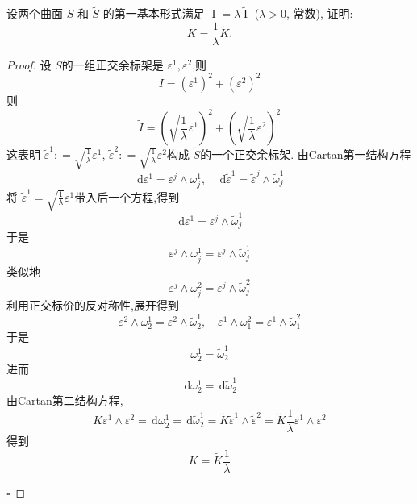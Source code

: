 \documentclass[../../main.tex]{subfiles}
\begin{document}
\begin{problem}
 设两个曲面 $S$ 和 $\tilde{S}$ 的第一基本形式满足 $\operatorname{I} = \lambda \tilde{\operatorname{I}}$ ($\lambda > 0$, 常数), 证明:
$$
K = \frac{1}{\lambda} \tilde{K}.
$$
\end{problem}
\begin{proof}
    设 \(  S  \)的一组正交余标架是 \(   \varepsilon ^{1}, \varepsilon ^{2}  \),则 \[
    I= \left(  \varepsilon ^{1} \right)^{2}+ \left(  \varepsilon ^{2} \right)^{2}  
    \]则 \[
    \tilde{I}= \left( \sqrt{ \frac{1}{\lambda} }  \varepsilon ^{1} \right)^{2}+  \left( \sqrt{ \frac{1}{\lambda} }  \varepsilon ^{2} \right)^{2}  
    \]  这表明 \(  \tilde{\varepsilon} ^{1}: =  \sqrt{ \frac{1}{\lambda} } \varepsilon ^{1}  \), \( \tilde{\varepsilon} ^{2}: =   \sqrt{ \frac{1}{\lambda} }  \varepsilon ^{2}  \)构成 \(  \tilde{S}  \)的一个正交余标架.   由Cartan第一结构方程 \[
    \,\mathrm{d}  \varepsilon ^{1}=  \varepsilon ^{j}\wedge  \omega _{j}^{1},\quad \,\mathrm{d}   \tilde{\varepsilon} ^{1}=  \tilde{\varepsilon} ^{j}\wedge  \tilde{\omega} _{j}^{1}
    \]将 \(   \tilde{\varepsilon} ^{1} = \sqrt{ \frac{1}{\lambda} } \varepsilon ^{1} \)带入后一个方程,得到 \[
    \,\mathrm{d}  \varepsilon ^{1}=  \varepsilon ^{j}\wedge  \tilde{\omega} _{j}^{1}
    \] 于是 \[
     \varepsilon ^{j}\wedge  \omega _{j}^{1}=  \varepsilon ^{j}\wedge  \tilde{\omega} _{j}^{1}
    \]类似地 \[
     \varepsilon ^{j}\wedge  \omega _{j}^{2}=  \varepsilon ^{j}\wedge   \tilde{\omega} _{j}^{2}
    \]利用正交标价的反对称性,展开得到 \[
     \varepsilon ^{2}\wedge  \omega _{2}^{1}=  \varepsilon ^{2}\wedge  \tilde{\omega} _{2}^{1},\quad  \varepsilon ^{1}\wedge  \omega _{1}^{2}=  \varepsilon ^{1}\wedge  \tilde{\omega} _{1}^{2}
    \]于是 \[
     \omega _{2}^{1}=  \tilde{\omega} _{2}^{1}
    \]进而 \[
    \,\mathrm{d}  \omega _{2}^{1}= \,\mathrm{d}   \tilde{\omega} _{2}^{1}
    \]由Cartan第二结构方程, \[
    K  \varepsilon ^{1}\wedge  \varepsilon ^{2}= \,\mathrm{d}  \omega _{2}^{1}= \,\mathrm{d}  \tilde{\omega} _{2}^{1} =  \tilde{K}  \tilde{\varepsilon} ^{1}\wedge  \tilde{\varepsilon} ^{2}= \tilde{K}  \frac{1}{\lambda}  \varepsilon ^{1}\wedge  \varepsilon ^{2}
    \]得到\[
    K= \tilde{K}\frac{1 }{ \lambda  } 
    \] 

    \hfill $\square$
\end{proof}
\end{document}
